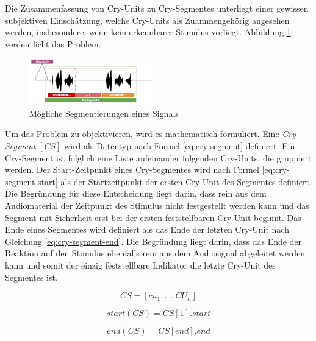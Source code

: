 Die Zusammenfassung von Cry-Units zu Cry-Segmentes unterliegt einer gewissen subjektiven Einschätzung, welche Cry-Units als Zuammengehörig angesehen werden, insbesondere, wenn kein erkennbarer Stimulus vorliegt. Abbildung \ref{img:segmenting02} verdeutlicht das Problem. 

\begin{figure}[H]
	\centering
	\includegraphics[width=0.48\textwidth]{bilder/segmentierung04.png}
	\caption{Mögliche Segmentierungen eines Signals}
	\label{img:segmenting02}
\end{figure}

Um das Problem zu objektivieren, wird es mathematisch formuliert. 
Eine \emph{Cry-Segment} $[CS]$ wird als Datentyp nach Formel \ref{eq:cry-segment} definiert. Ein Cry-Segment ist folglich eine Liste aufeinander folgenden Cry-Units, die gruppiert werden. Der Start-Zeitpunkt eines Cry-Segmentes wird nach Formel \ref{eq:cry-segment-start} als der Startzeitpunkt der ersten Cry-Unit des Segmentes definiert. Die Begründung für diese Entscheidung liegt darin, dass rein aus dem Audiomaterial der Zeitpunkt des Stimulus nicht festgestellt werden kann und das Segment mit Sicherheit erst bei der ersten feststellbaren Cry-Unit beginnt. Das Ende eines Segmentes wird definiert als das Ende der letzten Cry-Unit nach Gleichung \ref{eq:cry-segment-end}. Die Begründung liegt darin, dass das Ende der Reaktion auf den Stimulus ebenfalls rein aus dem Audiosignal abgeleitet werden kann und somit der einzig feststellbare Indikator die letzte Cry-Unit des Segmentes ist. 

\begin{equation}
CS = [cu_1 ,  ... ,  CU_n]
\label{eq:cry-segment}
\end{equation}

\begin{equation}
start(CS) = CS[1].start
\label{eq:cry-segment-start}
\end{equation}

\begin{equation}
end(CS) = CS[end].end
\label{eq:cry-segment-end}
\end{equation}

